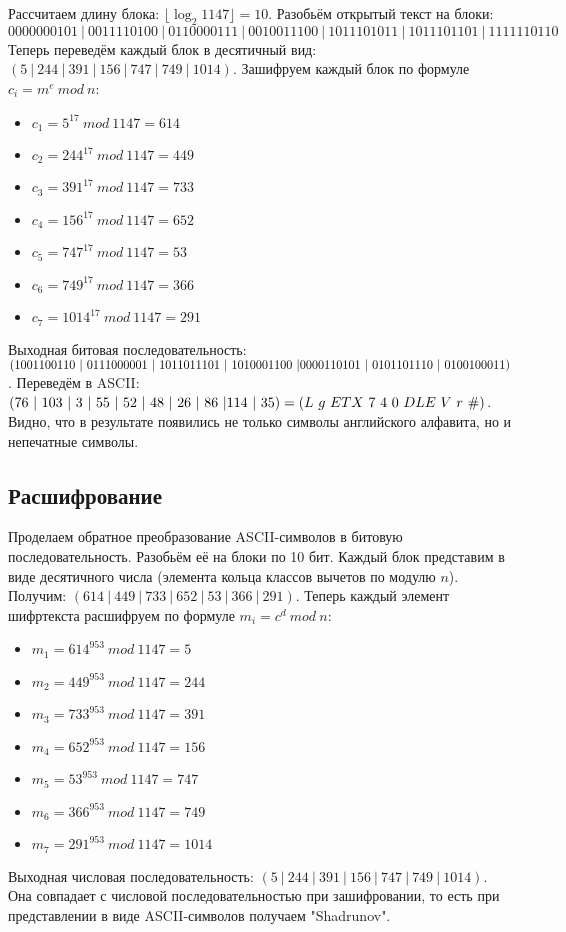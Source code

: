 Рассчитаем длину блока: $\lfloor \log_2 1147 \rfloor = 10$. Разобьём открытый текст на блоки: \linebreak $00000 00101 \ | \ 0011 1 10100 \ | \ 0 1100 001 11 \ | \ 00100  11100 \ | \ 10 111 0101 1 \ | \ 10111 0 1101\ |\ 111 11 10110$
Теперь переведём каждый блок в десятичный вид: $(5 \ | \ 244 \ | \ 391 \ | \ 156 \ | \ 747 \ | \ 749 \ | \ 1014)$.
Зашифруем каждый блок по формуле $c_i = m^e \ mod \ n$:
\begin{itemize}
    \item $c_1 = 5^{17} \ mod \ 1147 = 614$
    \item $c_2 = 244^{17} \ mod \ 1147 = 449$
    \item $c_3 = 391^{17} \ mod \ 1147 = 733$
    \item $c_4 = 156^{17} \ mod \ 1147 = 652$
    \item $c_5 = 747^{17} \ mod \ 1147 = 53$
    \item $c_6 = 749^{17} \ mod \ 1147 = 366$
    \item $c_7 = 1014^{17} \ mod \ 1147 = 291$
\end{itemize}
Выходная битовая последовательность: $(10011 00110 \ | \ 01110 00001 \ | \ 10110 11101 \ | \ 10100 01100 \ | \\ 00001 10101 \ | \ 01011 01110 \ | \ 01001 00011)$. Переведём в ASCII: $(76 \ | \ 103 \ | \ 3 \ | \ 55 \ | \ 52 \ | \ 48 \ | \ 26 \ | \ 86 \ | \\ 114 \ | \ 35) = (L  \ g \ ETX \ 7 \ 4 \ 0 \ DLE \ V \ r \ \#)$. Видно, что в результате появились не только символы английского алфавита, но и непечатные символы.


\subsection{Расшифрование}
Проделаем обратное преобразование ASCII-символов в битовую последовательность. Разобьём её на блоки по 10 бит. Каждый блок представим в виде десятичного числа (элемента кольца классов вычетов по модулю $n$). Получим: $(614 \ | \ 449 \ | \ 733 \ | \ 652 \ | \ 53 \ | \ 366 \ | \ 291)$. Теперь каждый элемент шифртекста расшифруем по формуле $m_i = c^d \ mod \ n$:
\begin{itemize}
    \item $m_1 = 614^{953} \ mod \ 1147 = 5$
    \item $m_2 = 449^{953} \ mod \ 1147 = 244$
    \item $m_3 = 733^{953} \ mod \ 1147 = 391$
    \item $m_4 = 652^{953} \ mod \ 1147 = 156$
    \item $m_5 = 53^{953} \ mod \ 1147 = 747$
    \item $m_6 = 366^{953} \ mod \ 1147 = 749$
    \item $m_7 = 291^{953} \ mod \ 1147 = 1014$
\end{itemize}
Выходная числовая последовательность: $(5 \ | \ 244 \ | \ 391 \ | \ 156 \ | \ 747 \ | \ 749 \ | \ 1014)$. Она совпадает с числовой последовательностью при зашифровании, то есть при представлении в виде ASCII-символов получаем "Shadrunov".
\newpage



